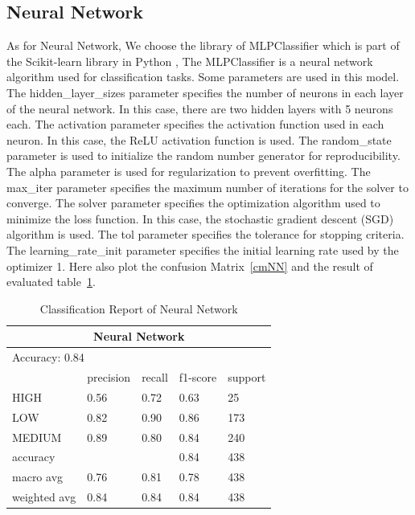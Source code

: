 \subsection{Neural Network}

As for Neural Network, We choose the library of MLPClassifier which is part of the Scikit-learn library in Python , The MLPClassifier is a neural network algorithm used for classification tasks. Some parameters are used in this model. The hidden\_layer\_sizes parameter specifies the number of neurons in each layer of the neural network. In this case, there are two hidden layers with 5 neurons each. The activation parameter specifies the activation function used in each neuron. In this case, the ReLU activation function is used. The random\_state parameter is used to initialize the random number generator for reproducibility. The alpha parameter is used for regularization to prevent overfitting. The max\_iter parameter specifies the maximum number of iterations for the solver to converge. The solver parameter specifies the optimization algorithm used to minimize the loss function. In this case, the stochastic gradient descent (SGD) algorithm is used. The tol parameter specifies the tolerance for stopping criteria. The learning\_rate\_init parameter specifies the initial learning rate used by the optimizer 1. 
Here also plot the confusion Matrix~\ref*{cmNN} and the result of evaluated table~\ref*{tableNN}.


\begin{table}[H]\centering
    \begin{tabular}{@{}lllll@{}}
    \toprule
    \multicolumn{5}{c}{Neural Network}                 \\ \midrule
    \multicolumn{5}{l}{Accuracy: 0.84}       \\\midrule
                 & precision & recall & f1-score & support \\
    HIGH         & 0.56      & 0.72   & 0.63     & 25      \\ 
    LOW          & 0.82      & 0.90   & 0.86     & 173     \\
    MEDIUM       & 0.89      & 0.80   & 0.84     & 240     \\
    accuracy     &           &        & 0.84     & 438     \\
    macro avg    & 0.76      & 0.81   & 0.78     & 438     \\
    weighted avg & 0.84      & 0.84   & 0.84     & 438     \\ \bottomrule
    \end{tabular}
    \caption{Classification Report of Neural Network}
    \label{tableNN}
\end{table}

